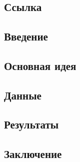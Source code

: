 \section{}

\subsection*{Ссылка}
\subsection*{Введение}
\subsection*{Основная идея}
\subsection*{Данные}
\subsection*{Результаты}
\subsection*{Заключение}